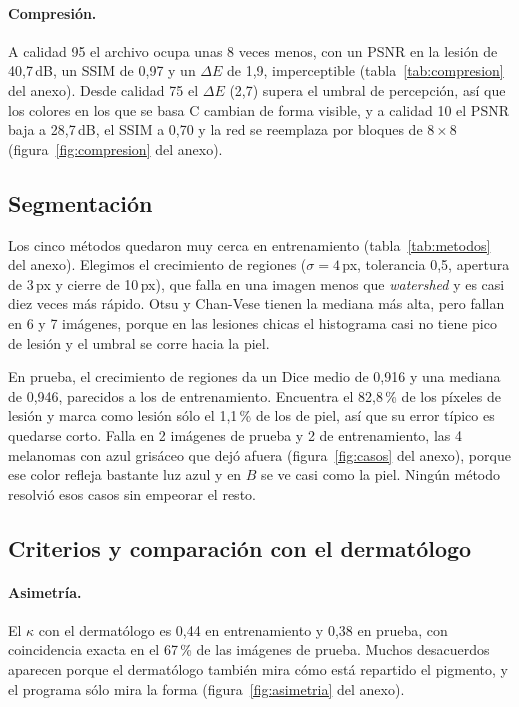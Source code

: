 \paragraph{Compresión.} A calidad 95 el archivo ocupa unas 8 veces menos, con un PSNR en la lesión de 40,7\,dB, un SSIM de 0,97 y un $\Delta E$ de 1,9, imperceptible (tabla~\ref{tab:compresion} del anexo). Desde calidad 75 el $\Delta E$ (2,7) supera el umbral de percepción, así que los colores en los que se basa C cambian de forma visible, y a calidad 10 el PSNR baja a 28,7\,dB, el SSIM a 0,70 y la red se reemplaza por bloques de $8\times8$ (figura~\ref{fig:compresion} del anexo).

\subsection{Segmentación}
\label{sec:res-segmentacion}
Los cinco métodos quedaron muy cerca en entrenamiento (tabla~\ref{tab:metodos} del anexo). Elegimos el crecimiento de regiones ($\sigma=4$\,px, tolerancia 0,5, apertura de 3\,px y cierre de 10\,px), que falla en una imagen menos que \emph{watershed} y es casi diez veces más rápido. Otsu y Chan-Vese tienen la mediana más alta, pero fallan en 6 y 7 imágenes, porque en las lesiones chicas el histograma casi no tiene pico de lesión y el umbral se corre hacia la piel.

En prueba, el crecimiento de regiones da un Dice medio de 0,916 y una mediana de 0,946, parecidos a los de entrenamiento. Encuentra el 82,8\,\% de los píxeles de lesión y marca como lesión sólo el 1,1\,\% de los de piel, así que su error típico es quedarse corto. Falla en 2 imágenes de prueba y 2 de entrenamiento, las 4 melanomas con azul grisáceo que dejó afuera (figura~\ref{fig:casos} del anexo), porque ese color refleja bastante luz azul y en $B$ se ve casi como la piel. Ningún método resolvió esos casos sin empeorar el resto.

\subsection{Criterios y comparación con el dermatólogo}
\paragraph{Asimetría.} El $\kappa$ con el dermatólogo es 0,44 en entrenamiento y 0,38 en prueba, con coincidencia exacta en el 67\,\% de las imágenes de prueba. Muchos desacuerdos aparecen porque el dermatólogo también mira cómo está repartido el pigmento, y el programa sólo mira la forma (figura~\ref{fig:asimetria} del anexo).

